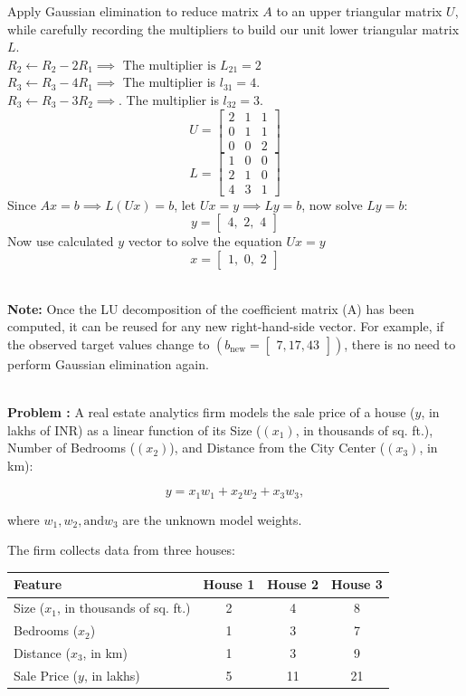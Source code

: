 \documentclass[DIV=20,oneside]{scrartcl}
\newcounter{problem}
\newcommand{\problem}{
	\stepcounter{problem}
	\noindent\textbf{\\Problem \theproblem: }
}
\newcommand{\note}{
	\noindent\textbf{\\Note: }
}
\begin{document}
Apply Gaussian elimination to reduce matrix $A$ to an upper triangular matrix $U$, while carefully recording the multipliers to build our unit lower triangular matrix $L$.\\
$R_2 \leftarrow R_2 - 2R_1 \implies \text{ The multiplier is }L_{21}=2$\\
$R_3 \leftarrow R_3 - 4R_1\implies$ The multiplier is $l_{31} = 4$.\\
$R_3 \leftarrow R_3 - 3R_2\implies$. The multiplier is $l_{32} = 3$.
$$U = \begin{bmatrix} 2 & 1 & 1 \\ 0 & 1 & 1 \\ 0 & 0 & 2 \end{bmatrix}$$
$$L = \begin{bmatrix} 1 & 0 & 0 \\ 2 & 1 & 0 \\ 4 & 3 & 1 \end{bmatrix}$$
Since $A x = b \implies L(Ux) = b$, let $Ux=y \implies Ly=b$, now solve $Ly = b$:  
$$y = \begin{bmatrix} 4,\,\, 2, \,\, 4 \end{bmatrix}$$
Now use calculated $y$ vector to solve the equation $Ux = y$
$$x = \begin{bmatrix} 1, \,\, 0, \,\, 2 \end{bmatrix}$$
\note Once the LU decomposition of the coefficient matrix (A) has been computed, it can be reused for any new right-hand-side vector. For example, if the observed target values change to $(b_{\text{new}}=\begin{bmatrix}7, 17, 43\end{bmatrix})$, there is no need to perform Gaussian elimination again.

\problem A real estate analytics firm models the sale price of a house ($y$, in lakhs of INR) as a linear function of its Size ($(x_1)$, in thousands of sq. ft.), Number of Bedrooms ($(x_2)$), and Distance from the City Center ($(x_3)$, in km):

\[
y=x_1w_1+x_2w_2+x_3w_3,
\]

where $w_1, w_2, \text{and} w_3$ are the unknown model weights.

The firm collects data from three houses:

\begin{table}[h]
	\centering
	\begin{tabular}{|l|c|c|c|}
		\hline
		\textbf{Feature} & \textbf{House 1} & \textbf{House 2} & \textbf{House 3} \\
		\hline
		Size ($x_1$, in thousands of sq. ft.) & 2 & 4 & 8 \\
		\hline
		Bedrooms ($x_2$) & 1 & 3 & 7 \\
		\hline
		Distance ($x_3$, in km) & 1 & 3 & 9 \\
		\hline
		Sale Price ($y$, in lakhs) & 5 & 11 & 21 \\
		\hline
	\end{tabular}
\end{table}
\end{document}
